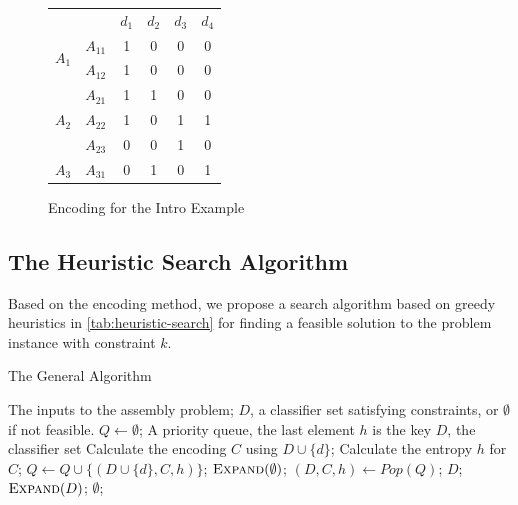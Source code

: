 \documentclass[sigplan,10pt,review]{acmart}\settopmatter{printfolios=true,printccs=false,printacmref=false}
\begin{document}
\begin{figure}[h]
	\begin{tabular}{|c|c|cccc|}
	\cline{1-6}
	\multicolumn{2}{|c|}{} & $d_1$ & $d_2$ & $d_3$ & $d_4$ \\ \cline{1-6}
	\multirow{2}{*}{$A_1$} & $A_{11}$ & 1 & 0 & 0 & 0 \\ \cline{2-6}
	 & $A_{12}$ & 1 & 0 & 0 & 0 \\ \cline{1-6}
	\multirow{3}{*}{$A_2$} & $A_{21}$ & 1 & 1 & 0 & 0 \\ \cline{2-6}
	 & $A_{22}$ & 1 & 0 & 1 & 1 \\ \cline{2-6}
	 & $A_{23}$ & 0 & 0 & 1 & 0 \\ \cline{1-6}
	$A_3$ & $A_{31}$ & 0 & 1 & 0 & 1 \\ \cline{1-6}
	\end{tabular}
	\caption{Encoding for the Intro Example}
	\label{fig:assemble-example-encoding}
\end{figure}

\subsection{The Heuristic Search Algorithm}
\label{sec:assembly-algorithm}
Based on the encoding method, we propose a search algorithm based on greedy heuristics in \cref{tab:heuristic-search} for finding a feasible solution to the problem instance with constraint $k$.

\begin{algorithm}[h]
	\caption{The General Algorithm}
	\label{tab:heuristic-search}
	\begin{algorithmic}[1]
		\Require The inputs to the assembly problem;
		\Ensure $D$, a classifier set satisfying constraints, or $\emptyset$ if not feasible.
		\State $Q \gets \emptyset$; \Comment A priority queue, the last element $h$ is the key
		 \Comment $D$, the classifier set
				\State Calculate the encoding $C$ using $D \cup \{d\}$;
				\State Calculate the entropy $h$ for $C$;
				\State $Q \gets Q \cup \{(D \cup \{d\}, C, h)\}$;
			\EndFor
		\EndFunction
			\State $\Call{Expand}{\emptyset}$;
				\State $(D, C, h) \gets Pop(Q)$;
					\State \Return $D$;
				\EndIf
					\State $\Call{Expand}{D}$;
				\EndIf
			\EndWhile
			\State \Return $\emptyset$;
		\EndFunction
	\end{algorithmic}
\end{algorithm}
\end{document}
